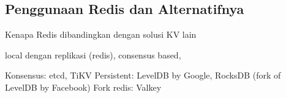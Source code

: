 \subsection{Penggunaan Redis dan Alternatifnya}

Kenapa Redis dibandingkan dengan solusi KV lain

local dengan replikasi (redis), consensus based,

Konsensus: etcd, TiKV
Persistent: LevelDB by Google, RocksDB (fork of LevelDB by Facebook)
Fork redis: Valkey
